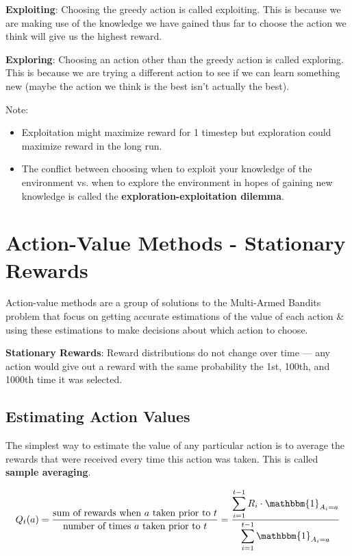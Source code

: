 \textbf{Exploiting}: Choosing the greedy action is called exploiting. This is because we are making use of the knowledge we have gained thus far to choose the action we think will give us the highest reward.

\textbf{Exploring}: Choosing an action other than the greedy action is called exploring. This is because we are trying a different action to see if we can learn something new (maybe the action we think is the best isn’t actually the best).

Note:
\begin{itemize}
    \item Exploitation might maximize reward for 1 timestep but exploration could maximize reward in the long run.
    \item The conflict between choosing when to exploit your knowledge of the environment vs. when to explore the environment in hopes of gaining new knowledge is called the \textbf{exploration-exploitation dilemma}.
\end{itemize}


\section{Action-Value Methods - Stationary Rewards \cite{medium-numsmt2-rl-ch2-part-2}}\label{Action-Value Methods - Stationary Rewards}
Action-value methods are a group of solutions to the Multi-Armed Bandits problem that focus on getting accurate estimations of the value of each action \& using these estimations to make decisions about which action to choose.

\textbf{Stationary Rewards}: Reward distributions do not change over time — any action would give out a reward with the same probability the 1st, 100th, and 1000th time it was selected.

\subsection{Estimating Action Values}
The simplest way to estimate the value of any particular action is to average the rewards that were received every time this action was taken. This is called \textbf{sample averaging}.

\[
    Q_t(a) = \displaystyle\frac{\text{sum of rewards when $a$ taken prior to $t$}}{\text{number of times $a$ taken prior to $t$}} = \displaystyle\frac{\displaystyle\sum_{i=1}^{t-1} R_i \cdot \mathbbm{1}_{A_i = a}}{\displaystyle\sum_{i=1}^{t-1} \mathbbm{1}_{A_i = a}}
\]

